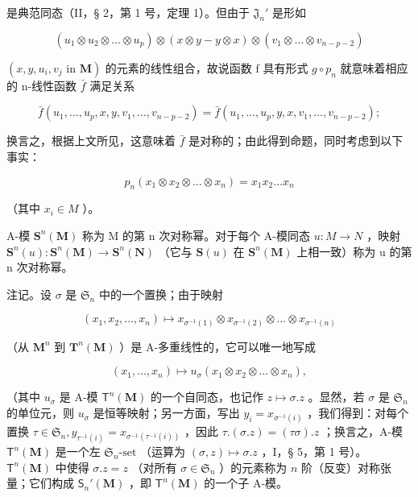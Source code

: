 是典范同态（II，§ 2，第 1 号，定理 1）。但由于 \(\mathfrak{J}_n'\) 是形如

\[
\left(u _ {1} \otimes u _ {2} \otimes \dots \otimes u _ {p}\right) \otimes (x \otimes y - y \otimes x) \otimes \left(v _ {1} \otimes \dots \otimes v _ {n - p - 2}\right)
\]

\((x, y, u_{i}, v_{j} \text{ in } \mathbf{M})\) 的元素的线性组合，故说函数 f 具有形式 \(g \circ p_{n}\) 就意味着相应的 n-线性函数 \(\bar{f}\) 满足关系

\[
\bar {f} (u _ {1}, \dots , u _ {p}, x, y, v _ {1}, \dots , v _ {n - p - 2}) = \bar {f} (u _ {1}, \dots , u _ {p}, y, x, v _ {1}, \dots , v _ {n - p - 2});
\]

换言之，根据上文所见，这意味着 \(\bar{f}\) 是对称的；由此得到命题，同时考虑到以下事实：

\[
p _ {n} (x _ {1} \otimes x _ {2} \otimes \dots \otimes x _ {n}) = x _ {1} x _ {2} \dots x _ {n}
\]

（其中 \(x_{i} \in M\) ）。

A-模 \(\mathbf{S}^{n}(\mathbf{M})\) 称为 M 的第 n 次对称幂。对于每个 A-模同态 \(u: M \to N\) ，映射 \(\mathbf{S}^{n}(u): \mathbf{S}^{n}(\mathbf{M}) \to \mathbf{S}^{n}(\mathbf{N})\) （它与 \(\mathbf{S}(u)\) 在 \(\mathbf{S}^{n}(\mathbf{M})\) 上相一致）称为 u 的第 n 次对称幂。

注记。设 \(\sigma\) 是 \(\mathfrak{S}_n\) 中的一个置换；由于映射

\[
\left(x _ {1}, x _ {2}, \dots , x _ {n}\right) \mapsto x _ {\sigma^ {- 1} (1)} \otimes x _ {\sigma^ {- 1} (2)} \otimes \dots \otimes x _ {\sigma^ {- 1} (n)}
\]

（从 \(\mathbf{M}^n\) 到 \(\mathbf{T}^n (\mathbf{M})\) ）是 A-多重线性的，它可以唯一地写成

\[
(x _ {1}, \dots , x _ {n}) \mapsto u _ {\sigma} (x _ {1} \otimes x _ {2} \otimes \dots \otimes x _ {n}),
\]

（其中 \(u_{\sigma}\) 是 A-模 \(\mathsf{T}^n(\mathbf{M})\) 的一个自同态，也记作 \(z \mapsto \sigma. z\) 。显然，若 \(\sigma\) 是 \(\mathfrak{S}_n\) 的单位元，则 \(u_{\sigma}\) 是恒等映射；另一方面，写出 \(y_i = x_{\sigma^{-1}(i)}\) ，我们得到：对每个置换 \(\tau \in \mathfrak{S}_n, y_{\tau^{-1}(i)} = x_{\sigma^{-1}(\tau^{-1}(i))}\) ，因此 \(\tau. (\sigma. z) = (\tau \sigma). z\) ；换言之，A-模 \(\mathsf{T}^n(\mathbf{M})\) 是一个左 \(\mathfrak{S}_n\text{-set}\) （运算为 \((\sigma, z) \mapsto \sigma. z\) ，I，§ 5，第 1 号）。 \(\mathsf{T}^n(\mathbf{M})\) 中使得 \(\sigma. z = z\) （对所有 \(\sigma \in \mathfrak{S}_n\) ）的元素称为 \(n\) 阶（反变）对称张量；它们构成 \(\mathsf{S}_n'(\mathbf{M})\) ，即 \(\mathsf{T}^n(\mathbf{M})\) 的一个子 A-模。


